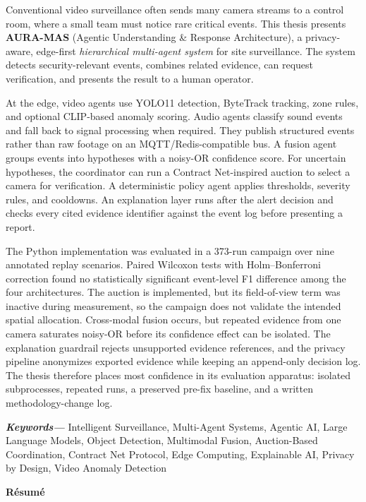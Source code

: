 \documentclass[openany,12pt,oneside]{extreport}
\begin{document}
Conventional video surveillance often sends many camera streams to a control room, where a small team must notice rare critical events. This thesis presents \textbf{AURA-MAS} (Agentic Understanding \& Response Architecture), a privacy-aware, edge-first \emph{hierarchical multi-agent system} for site surveillance. The system detects security-relevant events, combines related evidence, can request verification, and presents the result to a human operator.

At the edge, video agents use YOLO11 detection, ByteTrack tracking, zone rules, and optional CLIP-based anomaly scoring. Audio agents classify sound events and fall back to signal processing when required. They publish structured events rather than raw footage on an MQTT/Redis-compatible bus. A fusion agent groups events into hypotheses with a noisy-OR confidence score. For uncertain hypotheses, the coordinator can run a Contract Net-inspired auction to select a camera for verification. A deterministic policy agent applies thresholds, severity rules, and cooldowns. An explanation layer runs after the alert decision and checks every cited evidence identifier against the event log before presenting a report.

The Python implementation was evaluated in a 373-run campaign over nine annotated replay scenarios. Paired Wilcoxon tests with Holm--Bonferroni correction found no statistically significant event-level F1 difference among the four architectures. The auction is implemented, but its field-of-view term was inactive during measurement, so the campaign does not validate the intended spatial allocation. Cross-modal fusion occurs, but repeated evidence from one camera saturates noisy-OR before its confidence effect can be isolated. The explanation guardrail rejects unsupported evidence references, and the privacy pipeline anonymizes exported evidence while keeping an append-only decision log. The thesis therefore places most confidence in its evaluation apparatus: isolated subprocesses, repeated runs, a preserved pre-fix baseline, and a written methodology-change log.

\vskip 0.5cm
\providecommand{\keywords}[1] {
	\small
	\textbf{\textit{Keywords---}} #1
}
\keywords{Intelligent Surveillance, Multi-Agent Systems, Agentic AI, Large Language Models, Object Detection, Multimodal Fusion, Auction-Based Coordination, Contract Net Protocol, Edge Computing, Explainable AI, Privacy by Design, Video Anomaly Detection}

\newpage
\vspace*{3cm}
\begin{center}
	{\Large\bf Résumé}
\end{center} \vskip 1cm
\end{document}
